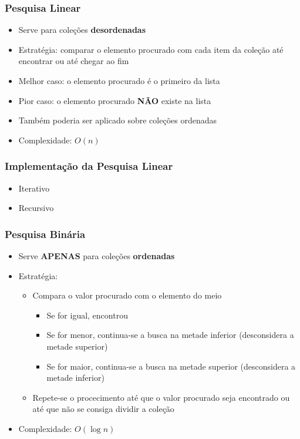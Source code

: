 \documentclass[aspectratio=169]{beamer}
\begin{document}
\begin{frame}\frametitle{Pesquisa Linear}
\begin{itemize}
	\item Serve para coleções \textbf{desordenadas}
	\item Estratégia: comparar o elemento procurado com cada item da coleção até encontrar ou até chegar ao fim
	\item Melhor caso: o elemento procurado é o primeiro da lista
	\item Pior caso: o elemento procurado \textbf{NÃO} existe na lista
	\item Também poderia ser aplicado sobre coleções ordenadas
	\pause
	\item Complexidade: $O(n)$
\end{itemize}
\end{frame}

\begin{frame}[fragile]\frametitle{Implementação da Pesquisa Linear}
\begin{itemize}
	\item Iterativo
{\scriptsize}
	\pause
	\item Recursivo
{\scriptsize}
\end{itemize}
\end{frame}

\begin{frame}\frametitle{Pesquisa Binária}
\begin{itemize}
	\item Serve \textbf{APENAS} para coleções \textbf{ordenadas}
	\item Estratégia:
	\begin{itemize}
		\item Compara o valor procurado com o elemento do meio
		\begin{itemize}
			\item Se for igual, encontrou
			\item Se for menor, continua-se a busca na metade inferior (desconsidera a metade superior)
			\item Se for maior, continua-se a busca na metade superior (desconsidera a metade inferior)
		\end{itemize}
		\item Repete-se o procecimento até que o valor procurado seja encontrado ou até que não se consiga dividir a coleção
	\end{itemize}
	\pause
		\item Complexidade: $O(\log{n})$
\end{itemize}
\end{frame}
\end{document}
